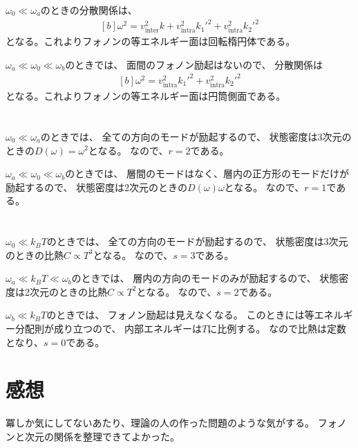 \documentclass[../ap_2014.tex]{subfiles}
\begin{document}
\(\omega_0\ll \omega_a\)のときの分散関係は、
\begin{equation}\begin{aligned}[b]
    \omega^2 = v_\text{inter}^2k+v_\text{intra}^2 k_1'^2+v_\text{intra}^2 k_2'^2
\end{aligned}\end{equation}
となる。これよりフォノンの等エネルギー面は回転楕円体である。

\(\omega_a\ll \omega_0 \ll \omega_b\)のときでは、
面間のフォノン励起はないので、
分散関係は
\begin{equation}\begin{aligned}[b]
    \omega^2 = v_\text{intra}^2 k_1'^2+v_\text{intra}^2 k_2'^2
\end{aligned}\end{equation}
となる。これよりフォノンの等エネルギー面は円筒側面である。

\section{}
\(\omega_0\ll \omega_a\)のときでは、
全ての方向のモードが励起するので、
状態密度は3次元のときの\(D(\omega)=\omega^2\)となる。
なので、\(r=2\)である。

\(\omega_a\ll \omega_0 \ll \omega_b\)のときでは、
層間のモードはなく、層内の正方形のモードだけが励起するので、
状態密度は2次元のときの\(D(\omega)\omega\)となる。
なので、\(r=1\)である。

\section{}
\(\omega_0\ll k_BT\)のときでは、
全ての方向のモードが励起するので、
状態密度は3次元のときの比熱\(C\propto T^3\)となる。
なので、\(s=3\)である。

\(\omega_a\ll k_BT \ll \omega_b\)のときでは、
層内の方向のモードのみが励起するので、
状態密度は2次元のときの比熱\(C\propto T^2\)となる。
なので、\(s=2\)である。

\(\omega_b \ll k_BT\)のときでは、
フォノン励起は見えなくなる。
このときには等エネルギー分配則が成り立つので、
内部エネルギーは\(T\)に比例する。
なので比熱は定数となり、\(s=0\)である。


\section*{感想}
冪しか気にしてないあたり、理論の人の作った問題のような気がする。
フォノンと次元の関係を整理できてよかった。
\end{document}

